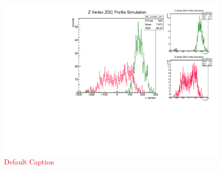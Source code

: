 \begin{figure}
\begin{center}
\includegraphics[width=\linewidth,height=\textheight,keepaspectratio]{../HourglassCorrection/figs/hsigma}
\caption{ \textcolor{red}{Default Caption} }
\label{fig:hsigma}
\end{center}
\end{figure}